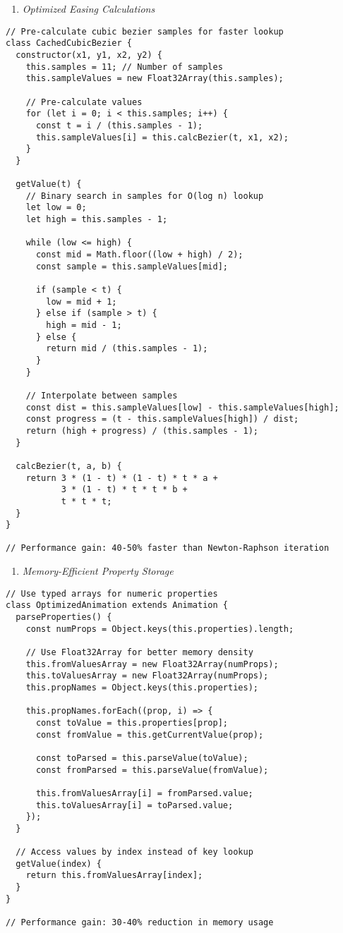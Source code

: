\documentclass[11pt]{article}
\begin{document}
\begin{enumerate}
\item \emph{Optimized Easing Calculations}
\end{enumerate}
\begin{verbatim}
// Pre-calculate cubic bezier samples for faster lookup
class CachedCubicBezier {
  constructor(x1, y1, x2, y2) {
    this.samples = 11; // Number of samples
    this.sampleValues = new Float32Array(this.samples);
    
    // Pre-calculate values
    for (let i = 0; i < this.samples; i++) {
      const t = i / (this.samples - 1);
      this.sampleValues[i] = this.calcBezier(t, x1, x2);
    }
  }
  
  getValue(t) {
    // Binary search in samples for O(log n) lookup
    let low = 0;
    let high = this.samples - 1;
    
    while (low <= high) {
      const mid = Math.floor((low + high) / 2);
      const sample = this.sampleValues[mid];
      
      if (sample < t) {
        low = mid + 1;
      } else if (sample > t) {
        high = mid - 1;
      } else {
        return mid / (this.samples - 1);
      }
    }
    
    // Interpolate between samples
    const dist = this.sampleValues[low] - this.sampleValues[high];
    const progress = (t - this.sampleValues[high]) / dist;
    return (high + progress) / (this.samples - 1);
  }
  
  calcBezier(t, a, b) {
    return 3 * (1 - t) * (1 - t) * t * a + 
           3 * (1 - t) * t * t * b + 
           t * t * t;
  }
}

// Performance gain: 40-50% faster than Newton-Raphson iteration
\end{verbatim}

\begin{enumerate}
\item \emph{Memory-Efficient Property Storage}
\end{enumerate}
\begin{verbatim}
// Use typed arrays for numeric properties
class OptimizedAnimation extends Animation {
  parseProperties() {
    const numProps = Object.keys(this.properties).length;
    
    // Use Float32Array for better memory density
    this.fromValuesArray = new Float32Array(numProps);
    this.toValuesArray = new Float32Array(numProps);
    this.propNames = Object.keys(this.properties);
    
    this.propNames.forEach((prop, i) => {
      const toValue = this.properties[prop];
      const fromValue = this.getCurrentValue(prop);
      
      const toParsed = this.parseValue(toValue);
      const fromParsed = this.parseValue(fromValue);
      
      this.fromValuesArray[i] = fromParsed.value;
      this.toValuesArray[i] = toParsed.value;
    });
  }
  
  // Access values by index instead of key lookup
  getValue(index) {
    return this.fromValuesArray[index];
  }
}

// Performance gain: 30-40% reduction in memory usage
\end{verbatim}
\end{document}
